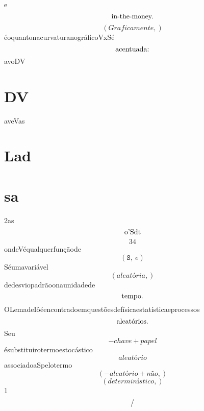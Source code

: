 \documentclass{article}
\begin{document}
\begin{equation}
\end{equation}e\begin{equation}
$in-the-money.$
\end{equation}\begin{equation}
\left( Graficamente,\right)
\end{equation}éoquantonacurvaturanográficoVxSé\begin{equation}
$acentuada:$
\end{equation}avoDV\section{DV}aveVas\section{Lad}\section{sa}2as\begin{equation}
$o'Sdt$
\end{equation}\begin{equation}
34
\end{equation}ondeVéqualquerfunçãode\begin{equation}
\left( \mathtt{\text{S}}, \  e\right)
\end{equation}Séumavariável\begin{equation}
\left( aleatória,\right)
\end{equation}dedesviopadrãoonaunidadede\begin{equation}
$tempo.$
\end{equation}OLemadeIôéencontradoemquestõesdefísicaestatísticaeprocessos\begin{equation}
$aleatórios.$
\end{equation}Seu\begin{equation}
- chave + papel
\end{equation}ésubstituirotermoestocástico\begin{equation}
aleatório
\end{equation}associadoaSpelotermo\begin{equation}
\left( - aleatório + não,\right)
\end{equation}\begin{equation}
\left( determinístico,\right)
\end{equation}1\begin{equation}
$/$
\end{equation}\begin{equation}

\end{equation}
\end{document}

